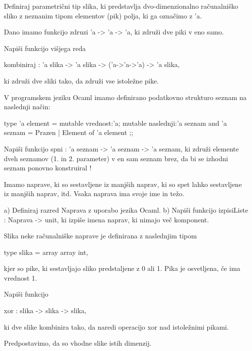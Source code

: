 \begin{ex}
Definiraj parametri\v cni tip slika, ki predstavlja dvo-dimenzionalno ra\v cunalni\v sko sliko z neznanim tipom elementov (pik) polja, ki ga ozna\v cimo z 'a. 

Dano imamo funkcijo zdruzi 'a -> 'a -> 'a, ki zdru\v zi dve piki v eno samo.

Napi\v si funkcijo vi\v sjega reda 

kombiniraj : 'a slika -> 'a slika -> ('a->'a->'a) -> 'a slika,

ki zdru\v zi dve sliki tako, da zdru\v zi vse istole\v zne pike. 


\end{ex} \begin{ex}
V programskem jeziku Ocaml imamo definirano podatkovno strukturo seznam na naslednji na\v cin: 

type 'a element = { 
    mutable vrednost:'a; 
    mutable naslednji:'a seznam 
   }
and 'a seznam = Prazen | Element of 'a element ;;

Napi\v si funkcijo spni : 'a seznam -> 'a seznam -> 'a seznam, ki zdru\v zi elemente dveh seznamov (1. in 2. parameter) v en sam seznam brez, da bi se izhodni seznam ponovno konstruiral !


\end{ex} \begin{ex}
Imamo naprave, ki so sestavljene iz manj\v sih naprav, ki so spet lahko sestavljene iz manj\v sih naprav, itd. Vsaka naprava ima svoje ime in te\v zo. 

a) Definiraj razred Naprava z uporabo jezika Ocaml.
b) Napi\v si funkcijo izpisiListe : Naprava -> unit, ki izpi\v se imena naprav, ki nimajo ve\v c komponent.



\end{ex} \begin{ex}
Slika neke ra\v cunalni\v ske naprave je definirana z naslednjim tipom 

type slika = array array int,

kjer so pike, ki sestavljajo sliko predstaljene z 0 ali 1. Pika je osvetljena, \v ce ima 
vrednost 1. 

Napi\v si funkcijo 

xor : slika -> slika -> slika, 

ki dve slike kombinira tako, da naredi operacijo xor nad istole\v znimi pikami.

Predpostavimo, da so vhodne slike istih dimenzij.



\end{ex}
